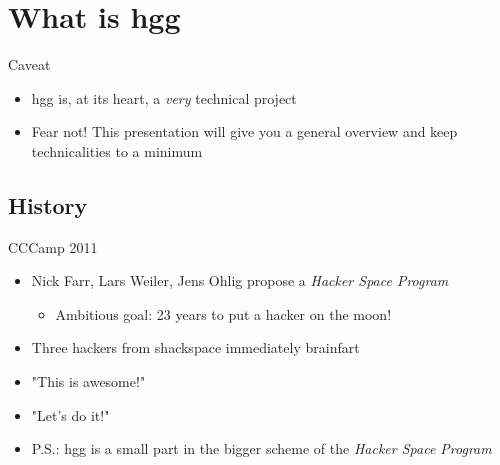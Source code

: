 
\newlength{\smallcol}
\setlength{\smallcol}{0.3\textwidth}

\newlength{\bigcol}
\setlength{\bigcol}{\textwidth}
\addtolength{\bigcol}{- \smallcol}


\begin{frame}[plain]
\end{frame}

\section{What is hgg}
	\begin{frame}{Caveat}
	\begin{itemize}
		\item hgg is, at its heart, a \emph{very} technical project
		\item Fear not!  This presentation will give you a general overview and keep technicalities to a minimum
	\end{itemize}
	\end{frame}

\subsection{History}
	\begin{frame}{CCCamp 2011}
		\begin{itemize}
			\item Nick Farr, Lars Weiler, Jens Ohlig propose a \emph{Hacker Space Program}
			\begin{itemize}
				\item Ambitious goal: 23 years to put a hacker on the moon!
			\end{itemize}
			\item Three hackers from shackspace immediately brainfart
			\item "This is awesome!"
			\item "Let's do it!"
			\item P.S.: hgg is a small part in the bigger scheme of the \emph{Hacker Space Program}
		\end{itemize}
	\end{frame}

